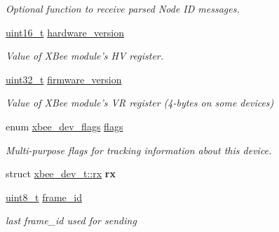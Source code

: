 \begin{DoxyCompactItemize}
\begin{DoxyCompactList}\small\item\em Optional function to receive parsed Node I\-D messages. \end{DoxyCompactList}\item 
\hypertarget{group__xbee__device_gad4c7c16c071f95965e2e506752b450fe}{\hyperlink{group__hal_ga5a8b2dc9e45a9ee81a94ef304fb62505}{uint16\-\_\-t} \hyperlink{group__xbee__device_gad4c7c16c071f95965e2e506752b450fe}{hardware\-\_\-version}}\label{group__xbee__device_gad4c7c16c071f95965e2e506752b450fe}

\begin{DoxyCompactList}\small\item\em Value of X\-Bee module's H\-V register. \end{DoxyCompactList}\item 
\hypertarget{group__xbee__device_gac8e0f35fdeff288dd1a7b4f49754c9b2}{\hyperlink{group__hal__dos_ga09a1e304d66d35dd47daffee9731edaa}{uint32\-\_\-t} \hyperlink{group__xbee__device_gac8e0f35fdeff288dd1a7b4f49754c9b2}{firmware\-\_\-version}}\label{group__xbee__device_gac8e0f35fdeff288dd1a7b4f49754c9b2}

\begin{DoxyCompactList}\small\item\em Value of X\-Bee module's V\-R register (4-\/bytes on some devices) \end{DoxyCompactList}\item 
\hypertarget{group__xbee__device_ga9ac684521a8154bddc272049a7a61b73}{enum \hyperlink{group__xbee__device_ga80478d6b87ebdf34b5ec06e5ca6f309e}{xbee\-\_\-dev\-\_\-flags} \hyperlink{group__xbee__device_ga9ac684521a8154bddc272049a7a61b73}{flags}}\label{group__xbee__device_ga9ac684521a8154bddc272049a7a61b73}

\begin{DoxyCompactList}\small\item\em Multi-\/purpose flags for tracking information about this device. \end{DoxyCompactList}\item 
\hypertarget{group__xbee__device_ga43dd406313bf0281f9a7b9a6c1555fc6}{struct \hyperlink{structxbee__dev__t_1_1rx}{xbee\-\_\-dev\-\_\-t\-::rx} {\bfseries rx}}\label{group__xbee__device_ga43dd406313bf0281f9a7b9a6c1555fc6}

\item 
\hypertarget{group__xbee__device_ga03c1016ac46b9df250b994f242cf956a}{\hyperlink{group__hal_gae1affc9ca37cfb624959c866a73f83c2}{uint8\-\_\-t} \hyperlink{group__xbee__device_ga03c1016ac46b9df250b994f242cf956a}{frame\-\_\-id}}\label{group__xbee__device_ga03c1016ac46b9df250b994f242cf956a}

\begin{DoxyCompactList}\small\item\em last frame\-\_\-id used for sending \end{DoxyCompactList}\end{DoxyCompactItemize}



